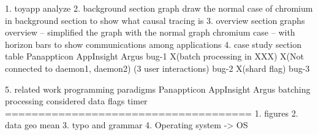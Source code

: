 1. toyapp analyze
2. background section graph
    draw the normal case of chromium in background section to show what causal tracing is
3. overview section graphs
    overview -- simplified the graph with the normal graph
    chromium case -- with horizon bars to show communications among applications
4. case study section table
            Panappticon                         AppInsight                                  Argus
    bug-1   X(batch processing in XXX)         X(Not connected to daemon1, daemon2)         (3 user interactions)
    bug-2   X(shard flag)
    bug-3 

5. related work
    programming paradigms   Panappticon          AppInsight                 Argus 
    batching processing                                                  considered
    data flags
    timer
=====================================
1. figures
2. data geo mean
3. typo and grammar
4. Operating system -> OS
